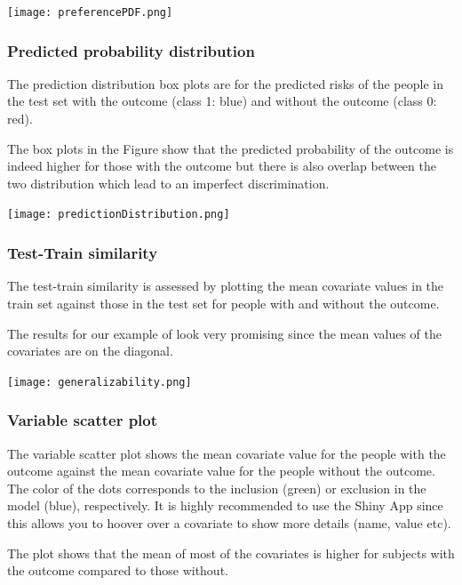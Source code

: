 \documentclass[]{article}
\begin{document}
\texttt{[image: preferencePDF.png]}

\newpage

\subsubsection{Predicted probability
distribution}\label{predicted-probability-distribution}

The prediction distribution box plots are for the predicted risks of the
people in the test set with the outcome (class 1: blue) and without the
outcome (class 0: red).

The box plots in the Figure show that the predicted probability of the
outcome is indeed higher for those with the outcome but there is also
overlap between the two distribution which lead to an imperfect
discrimination.

\texttt{[image: predictionDistribution.png]}

\newpage

\subsubsection{Test-Train similarity}\label{test-train-similarity}

The test-train similarity is assessed by plotting the mean covariate
values in the train set against those in the test set for people with
and without the outcome.

The results for our example of look very promising since the mean values
of the covariates are on the diagonal.

\texttt{[image: generalizability.png]}

\newpage

\subsubsection{Variable scatter plot}\label{variable-scatter-plot}

The variable scatter plot shows the mean covariate value for the people
with the outcome against the mean covariate value for the people without
the outcome. The color of the dots corresponds to the inclusion (green)
or exclusion in the model (blue), respectively. It is highly recommended
to use the Shiny App since this allows you to hoover over a covariate to
show more details (name, value etc).

The plot shows that the mean of most of the covariates is higher for
subjects with the outcome compared to those without.
\end{document}
